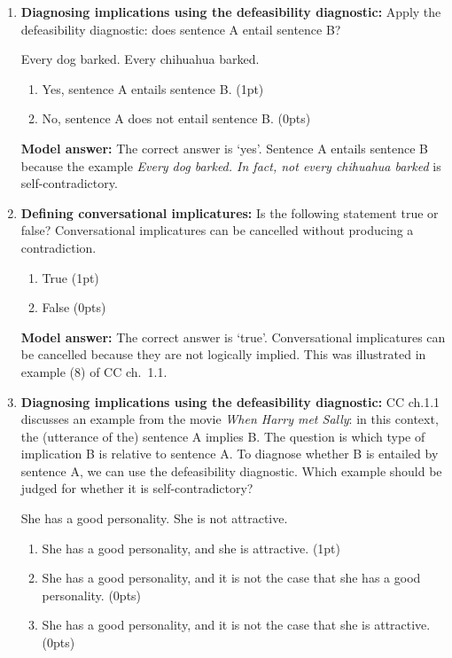\documentclass[a4,11pt]{article}
\begin{document}
\begin{enumerate}[leftmargin = 12pt]
\item {\bf Diagnosing implications using the defeasibility diagnostic:} Apply the defeasibility diagnostic: does sentence A entail sentence B?

\begin{exe}
\exi{}
\begin{xlist}
 Every dog barked.
 Every chihuahua barked.
\end{xlist}
\end{exe}
\begin{enumerate}
    \item Yes, sentence A entails sentence B. (1pt)
    \item No, sentence A does not entail sentence B. (0pts)
\end{enumerate}

{\bf Model answer:} The correct answer is `yes'. Sentence A entails sentence B because the example {\em Every dog barked. In fact, not every chihuahua barked} is self-contradictory.

     \item {\bf Defining conversational implicatures:} Is the following statement true or false? Conversational implicatures can be cancelled without producing a contradiction. 
   \begin{enumerate}[noitemsep]
        \item True (1pt)
        \item False (0pts)
    \end{enumerate}
    
      {\bf Model answer:} The correct answer is `true'. Conversational implicatures can be cancelled because they are not logically implied. This was illustrated in example (8) of CC ch.\ 1.1.

  
\item {\bf Diagnosing implications using the defeasibility diagnostic:} CC ch.1.1 discusses an example from the movie {\em When Harry met Sally}: in this context, the (utterance of the) sentence A implies B. The question is which type of implication B is relative to sentence A. To diagnose whether B is entailed by sentence A, we can use the defeasibility diagnostic. Which example should be judged for whether it is self-contradictory?

\begin{exe}
\exi{}
\begin{xlist}
 She has a good personality. 
 She is not attractive. 
\end{xlist}
\end{exe}
\begin{enumerate}
    \item She has a good personality, and she is attractive. (1pt)
    \item She has a good personality, and it is not the case that she has a good personality. (0pts)
    \item She has a good personality, and it is not the case that she is attractive. (0pts)
\end{enumerate}


\end{enumerate}
\end{document}
